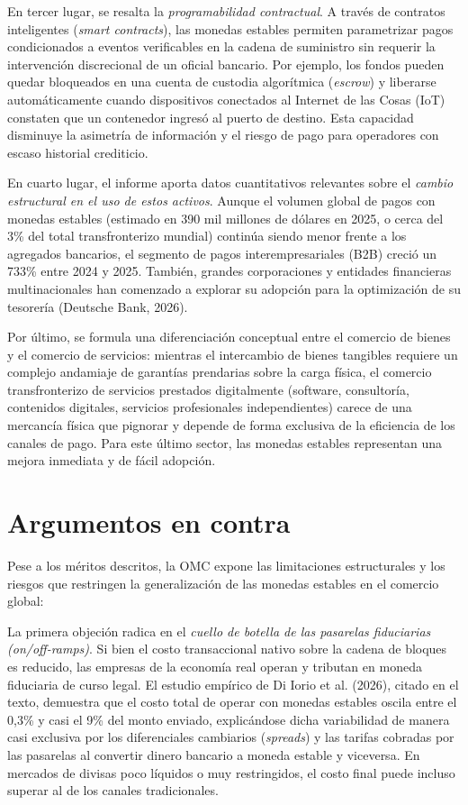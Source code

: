 \documentclass[spanish,11pt]{article}
\begin{document}
En tercer lugar, se resalta la \emph{programabilidad contractual}. A través de contratos inteligentes (\emph{smart contracts}), 
las monedas estables permiten parametrizar pagos condicionados a eventos verificables en la cadena de suministro 
sin requerir la intervención discrecional de un oficial bancario. Por ejemplo, los fondos pueden quedar bloqueados en una 
cuenta de custodia algorítmica (\emph{escrow}) y liberarse automáticamente cuando dispositivos conectados al 
Internet de las Cosas (IoT) constaten que un contenedor ingresó al puerto de destino. Esta capacidad disminuye la asimetría 
de información y el riesgo de pago para operadores con escaso historial crediticio.

En cuarto lugar, el informe aporta datos cuantitativos relevantes sobre el \emph{cambio estructural en el uso de estos activos}. 
Aunque el volumen global de pagos con monedas estables (estimado en 390 mil millones de dólares en 2025, o cerca del 3\% del 
total transfronterizo mundial) continúa siendo menor frente a los agregados bancarios, el segmento de pagos interempresariales (B2B) 
creció un 733\% entre 2024 y 2025. También, grandes corporaciones y entidades financieras multinacionales han comenzado a explorar 
su adopción para la optimización de su tesorería (Deutsche Bank, 2026).

Por último, se formula una diferenciación conceptual entre el comercio de bienes y el comercio de servicios: mientras el intercambio 
de bienes tangibles requiere un complejo andamiaje de garantías prendarias sobre la carga física, el comercio transfronterizo de 
servicios prestados digitalmente (software, consultoría, contenidos digitales, servicios profesionales independientes) carece de 
una mercancía física que pignorar y depende de forma exclusiva de la eficiencia de los canales de pago. Para este último sector, 
las monedas estables representan una mejora inmediata y de fácil adopción.

\section{Argumentos en contra}\label{argumentos-en-contra}

Pese a los méritos descritos, la OMC expone las limitaciones estructurales y los riesgos que restringen la 
generalización de las monedas estables en el comercio global:

La primera objeción radica en el \emph{cuello de botella de las pasarelas fiduciarias (on/off-ramps)}. Si bien el costo 
transaccional nativo sobre la cadena de bloques es reducido, las empresas de la economía real operan y tributan en moneda 
fiduciaria de curso legal. El estudio empírico de Di Iorio et al. (2026), citado en el texto, demuestra que el costo total de
operar con monedas estables oscila entre el 0,3\% y casi el 9\% del monto enviado, explicándose dicha variabilidad de manera 
casi exclusiva por los diferenciales cambiarios (\emph{spreads}) y las tarifas cobradas por las pasarelas al convertir 
dinero bancario a moneda estable y viceversa. En mercados de divisas poco líquidos o muy restringidos, el costo final puede 
incluso superar al de los canales tradicionales.
\end{document}
